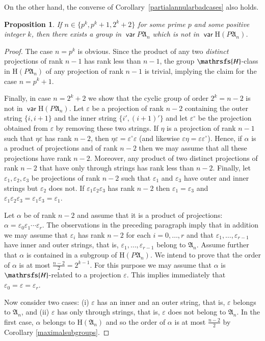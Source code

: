 \documentclass[preprint,1p,times]{elsarticle}
\DeclareMathOperator{\var}{\mathsf{var}}
\numberwithin{equation}{section}
\newtheorem{Prop}[Thm]{Proposition}
\theoremstyle{remark}
\def\Hc{\mathrsfs{H}}
\def\al{\alpha}
\def\ep{\varepsilon}
\def\H{\mathrm H}
\def\A{\mathfrak{A}}
\begin{document}
On the other hand, the converse of Corollary~\ref{partialannularbadcases} also holds.

\begin{Prop}
\label{partialannulargoodcases} If $n\in\{p^k,p^k+1,2^k+2\}$ for some prime $p$ and some positive integer $k$, then
there exists a group in $\var P\A_n$ which is not in $\var\H(P\A_n)$.
\end{Prop}

\begin{proof} The case $n=p^k$ is obvious. Since the product of any two
\emph{distinct} projections of rank $n-1$ has rank less than $n-1$, the group $\Hc$-class in $\H(P\A_n)$ of any
projection of rank $n-1$ is trivial, implying the claim for the case $n=p^k+1$.

Finally, in case $n=2^k+2$ we show that the cyclic group of order $2^k=n-2$ is not in $\var\H(P\A_n)$. Let $\ep$ be a
projection of rank $n-2$ containing the outer string $\{i,i+1\}$ and the inner string $\{i',(i+1)'\}$ and let
$\ep^\circ$ be the projection obtained from $\ep$ by removing these two strings. If $\eta$ is a projection of rank
$n-1$ such that $\eta\ep$ has rank $n-2$, then $\eta\ep=\ep^\circ\ep$ (and likewise $\ep\eta=\ep\ep^\circ$). Hence, if
$\al$ is {a product of projections and of rank $n-2$} then we may assume that all these projections have rank  $n-2$.
Moreover, any product of two distinct projections of rank $n-2$ that have only through strings has rank less than
$n-2$. Finally, let $\ep_1, \ep_2, \ep_3$ be projections of rank $n-2$ such that $\ep_1$ and $\ep_3$ have outer and
inner strings but $\ep_2$ does not. If $\ep_1\ep_2\ep_3$ has rank $n-2$ then $\ep_1=\ep_3$ and
$\ep_1\ep_2\ep_3=\ep_1\ep_3=\ep_1$.

Let $\alpha$ be of rank $n-2$ and assume that it is a product of projections: $\alpha=\ep_0\ep_1\cdots \ep_r$. The
observations in the preceding paragraph imply that in addition we may assume that $\ep_i$ has rank $n-2$ for each
$i=0,\dots,r$ and that $\ep_1,\dots, \ep_{r-1}$ have inner and outer strings, that is, $\ep_1,\dots, \ep_{r-1}$ belong
to $\A_n$. Assume further that $\alpha$ is contained in a subgroup of $\H (P\A_n)$. We intend to prove that the order
of $\alpha$ is at most $\frac{n-2}2=2^{k-1}$. For this purpose we may assume that $\alpha$ is $\Hc$-related to a
projection $\ep$. This implies immediately that $\ep_0=\ep=\ep_r$.

Now consider two cases: (i) $\ep$ has an inner and an outer string, that is, $\ep$ belongs to $\A_n$, and (ii) $\ep$
has only through strings, that is, $\ep$ does not belong to $\A_n$. In the first case, $\alpha$ belongs to $\H(\A_n)$
and so the order of $\alpha$ is at most $\frac{n-2}2$ by Corollary \ref{maximalsubgroups}.


\end{proof}
\end{document}
